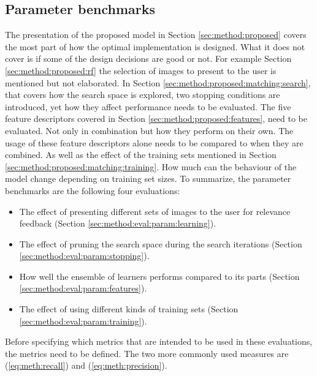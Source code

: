 \subsection{Parameter benchmarks}
\label{sec:method:eval:param}
The presentation of the proposed model in Section \ref{sec:method:proposed} covers the most part of how the optimal implementation is designed. What it does not cover is if some of the design decisions are good or not. For example Section \ref{sec:method:proposed:rf} the selection of images to present to the user is mentioned but not elaborated. In Section \ref{sec:method:proposed:matching:search}, that covers how the search space is explored, two stopping conditions are introduced, yet how they affect performance needs to be evaluated. The five feature descriptors covered in Section \ref{sec:method:proposed:features}, need to be evaluated. Not only in combination but how they perform on their own.
The usage of these feature descriptors alone needs to be compared to when they are combined. As well as the effect of the training sets mentioned in Section \ref{sec:method:proposed:matching:training}. How much can the behaviour of the model change depending on training set sizes.
To summarize, the parameter benchmarks are the following four evaluations:
\begin{itemize}
\item The effect of presenting different sets of images to the user for relevance feedback (Section \ref{sec:method:eval:param:learning}).
\item The effect of pruning the search space during the search iterations (Section \ref{sec:method:eval:param:stopping}).
\item How well the ensemble of learners performs compared to its parts (Section \ref{sec:method:eval:param:features}).
\item The effect of using different kinds of training sets (Section \ref{sec:method:eval:param:training}).
\end{itemize}
\medskip

Before specifying which metrics that are intended to be used in these evaluations, the metrics need to be defined. The two more commonly used measures are (\ref{eq:meth:recall}) and (\ref{eq:meth:precision}).

